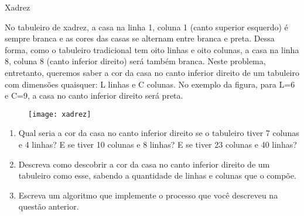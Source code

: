 \begin{task}{Xadrez}

No tabuleiro de xadrez, a casa na linha 1, coluna 1 (canto superior esquerdo) é sempre branca e as cores das casas se alternam entre branca e preta. Dessa forma, como o tabuleiro tradicional tem oito linhas e oito colunas, a casa na linha 8, coluna 8 (canto inferior direito) será também branca. Neste problema, entretanto, queremos saber a cor da casa no canto inferior direito de um tabuleiro com dimensões quaisquer: L linhas e C colunas. No exemplo da figura, para L=6 e C=9, a casa no canto inferior direito será preta.

\begin{figure}[H]
\centering

\texttt{[image: xadrez]}
\end{figure}

\begin{enumerate}
\item Qual seria a cor da casa no canto inferior direito se o tabuleiro tiver 7 colunas e 4 linhas? E se tiver 10 colunas e 8 linhas? E se tiver 23 colunas e 40 linhas?

\item Descreva como descobrir a cor da casa no canto inferior direito de um tabuleiro como esse, sabendo a quantidade de linhas e colunas que o compõe.

\item Escreva um algoritmo que implemente o processo que você descreveu na questão anterior.
\end{enumerate}
\end{task}

